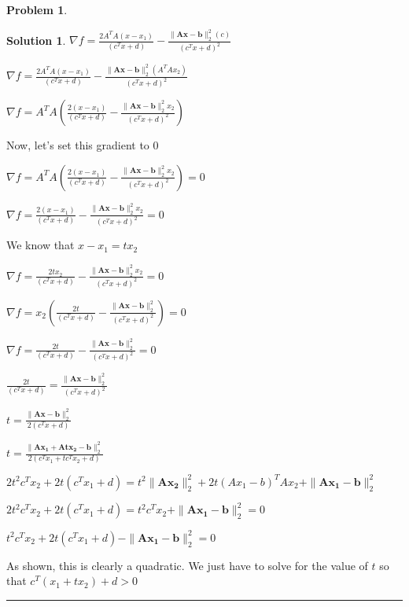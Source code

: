\documentclass{article}
\theoremstyle{definition}
\newtheorem{problem}{Problem}
\def\fline{\rule{0.75\linewidth}{0.5pt}}
\newcommand{\finishline}{\begin{center}\fline\end{center}}
\newtheorem*{solution*}{Solution}
\newenvironment{solution}{\begin{solution*}}{{\finishline} \end{solution*}}
\begin{document}
\begin{problem}
\begin{enumerate}
\begin{solution}
        $\nabla f = \frac{2A^T A (x - x_1)}{(c^Tx + d)} - \frac{\|\mathbf{Ax - b}\|^2_2 (c)}{(c^Tx + d) ^ 2}$ \newline 

        $\nabla f = \frac{2A^T A (x - x_1)}{(c^Tx + d)} - \frac{\|\mathbf{Ax - b}\|^2_2 (A^T A x_2)}{(c^Tx + d) ^ 2}$ \newline 

        $\nabla f = A^T A (\frac{2 (x - x_1)}{(c^Tx + d)} - \frac{\|\mathbf{Ax - b}\|^2_2 x_2}{(c^Tx + d) ^ 2})$ \newline 

        Now, let's set this gradient to 0 \newline 

        $\nabla f = A^T A (\frac{2 (x - x_1)}{(c^Tx + d)} - \frac{\|\mathbf{Ax - b}\|^2_2 x_2}{(c^Tx + d) ^ 2}) = 0$ \newline 

        $\nabla f = \frac{2 (x - x_1)}{(c^Tx + d)} - \frac{\|\mathbf{Ax - b}\|^2_2 x_2}{(c^Tx + d) ^ 2} = 0$ \newline 

        We know that $x - x_1 = tx_2$ \newline 

        $\nabla f = \frac{2 tx_2}{(c^Tx + d)} - \frac{\|\mathbf{Ax - b}\|^2_2 x_2}{(c^Tx + d) ^ 2} = 0$ \newline 

         $\nabla f = x_2 (\frac{2 t}{(c^Tx + d)} - \frac{\|\mathbf{Ax - b}\|^2_2 }{(c^Tx + d) ^ 2}) = 0$ \newline 

         $\nabla f = \frac{2 t}{(c^Tx + d)} - \frac{\|\mathbf{Ax - b}\|^2_2 }{(c^Tx + d) ^ 2} = 0$ \newline 

         $\frac{2 t}{(c^Tx + d)}  = \frac{\|\mathbf{Ax - b}\|^2_2 }{(c^Tx + d) ^ 2}$ \newline 

         $t = \frac{\|\mathbf{Ax - b}\|^2_2 }{2(c^Tx + d)}$ \newline 

         $t = \frac{\|\mathbf{Ax_1 + Atx_2 - b}\|^2_2 }{2(c^Tx_1 + tc^Tx_2 + d)}$ \newline 


         $2t^2 c^Tx_2 + 2t(c^Tx_1 + d) = t^2 \|\mathbf{Ax_2}\|^2_2 + 2t(Ax_1 - b)^T Ax_2 +  \|\mathbf{Ax_1 - b}\|^2_2 $ \newline 

         $2t^2 c^Tx_2 + 2t(c^Tx_1 + d) = t^2 c^T x_2 +  \|\mathbf{Ax_1 - b}\|^2_2  = 0$ \newline 

         $t^2 c^Tx_2 + 2t(c^Tx_1 + d) - \|\mathbf{Ax_1 - b}\|^2_2  = 0 $ \newline 


         As shown, this is clearly a quadratic. We just have to solve for the value of $t$ so that $c^T(x_1 + tx_2) + d > 0$

         
        
        
    \end{solution}
\end{enumerate}
\end{problem}
\end{document}
